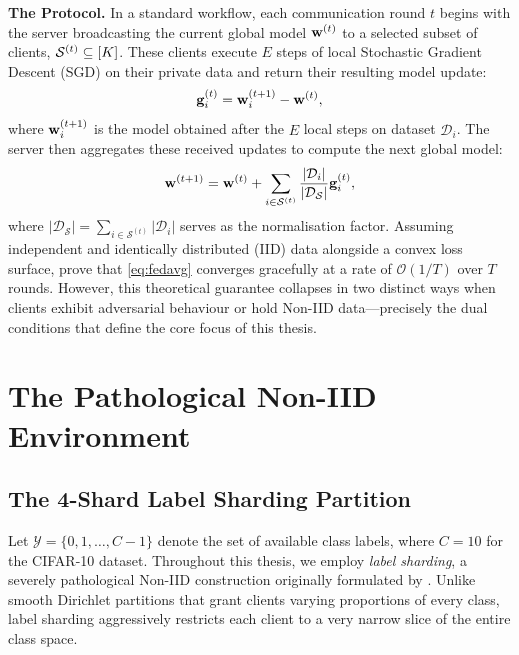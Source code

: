\documentclass[../main]{subfiles}
\begin{document}
\textbf{The \fedavg{} Protocol.}
In a standard \fedavg{} workflow, each communication round $t$ begins with the server broadcasting the current global model $\mathbf{w}^{(t)}$ to a selected subset of clients, $\mathcal{S}^{(t)} \subseteq [K]$. These clients execute $E$ steps of local Stochastic Gradient Descent (SGD) on their private data and return their resulting model update:
\begin{equation}
    \mathbf{g}_{i}^{(t)} = \mathbf{w}_i^{(t+1)} - \mathbf{w}^{(t)},
    \label{eq:local_update}
\end{equation}
where $\mathbf{w}_i^{(t+1)}$ is the model obtained after the $E$ local steps on dataset $\mathcal{D}_i$. The server then aggregates these received updates to compute the next global model:
\begin{equation}
    \mathbf{w}^{(t+1)} = \mathbf{w}^{(t)} + \sum_{i \in \mathcal{S}^{(t)}} \frac{|\mathcal{D}_i|}{|\mathcal{D}_{\mathcal{S}}|} \mathbf{g}_{i}^{(t)},
    \label{eq:fedavg}
\end{equation}
where $|\mathcal{D}_{\mathcal{S}}| = \sum_{i \in \mathcal{S}^{(t)}} |\mathcal{D}_i|$ serves as the normalisation factor. Assuming independent and identically distributed (IID) data alongside a convex loss surface, \citet{mcmahan2017communication} prove that \eqref{eq:fedavg} converges gracefully at a rate of $\mathcal{O}(1/T)$ over $T$ rounds. However, this theoretical guarantee collapses in two distinct ways when clients exhibit adversarial behaviour or hold Non-IID data---precisely the dual conditions that define the core focus of this thesis.

\section{The Pathological Non-IID Environment}
\label{sec:bg_noniid}

\subsection{The 4-Shard Label Sharding Partition}
\label{sec:bg_sharding}

Let $\mathcal{Y} = \{0, 1, \ldots, C-1\}$ denote the set of available class labels, where $C = 10$ for the CIFAR-10 dataset. Throughout this thesis, we employ \emph{label sharding}, a severely pathological Non-IID construction originally formulated by \citet{mcmahan2017communication}. Unlike smooth Dirichlet partitions that grant clients varying proportions of every class, label sharding aggressively restricts each client to a very narrow slice of the entire class space.
\end{document}
